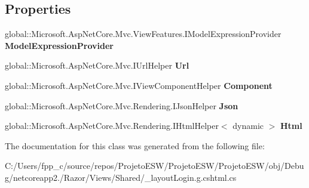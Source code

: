 \subsection*{Properties}
\begin{DoxyCompactItemize}
\item 
\mbox{\label{class_asp_net_core_1_1_views___shared____layout_login_ab0d2ee1f511f32459f91725b810bc72f}} 
global\+::\+Microsoft.\+Asp\+Net\+Core.\+Mvc.\+View\+Features.\+I\+Model\+Expression\+Provider {\bfseries Model\+Expression\+Provider}
\item 
\mbox{\label{class_asp_net_core_1_1_views___shared____layout_login_a912becf05ebefd0108c2e74da88eb86e}} 
global\+::\+Microsoft.\+Asp\+Net\+Core.\+Mvc.\+I\+Url\+Helper {\bfseries Url}
\item 
\mbox{\label{class_asp_net_core_1_1_views___shared____layout_login_ad5859b9b1756a05e61d7135a71dc83b3}} 
global\+::\+Microsoft.\+Asp\+Net\+Core.\+Mvc.\+I\+View\+Component\+Helper {\bfseries Component}
\item 
\mbox{\label{class_asp_net_core_1_1_views___shared____layout_login_a78562dc3ec14b909f82629f5e8d0f84c}} 
global\+::\+Microsoft.\+Asp\+Net\+Core.\+Mvc.\+Rendering.\+I\+Json\+Helper {\bfseries Json}
\item 
\mbox{\label{class_asp_net_core_1_1_views___shared____layout_login_ad9b88b26b9705c0092cf177edfab1234}} 
global\+::\+Microsoft.\+Asp\+Net\+Core.\+Mvc.\+Rendering.\+I\+Html\+Helper$<$ dynamic $>$ {\bfseries Html}
\end{DoxyCompactItemize}


The documentation for this class was generated from the following file\+:\begin{DoxyCompactItemize}
\item 
C\+:/\+Users/fpp\+\_\+c/source/repos/\+Projeto\+E\+S\+W/\+Projeto\+E\+S\+W/\+Projeto\+E\+S\+W/obj/\+Debug/netcoreapp2./\+Razor/\+Views/\+Shared/\+\_\+layout\+Login.\+g.\+cshtml.\+cs\end{DoxyCompactItemize}
